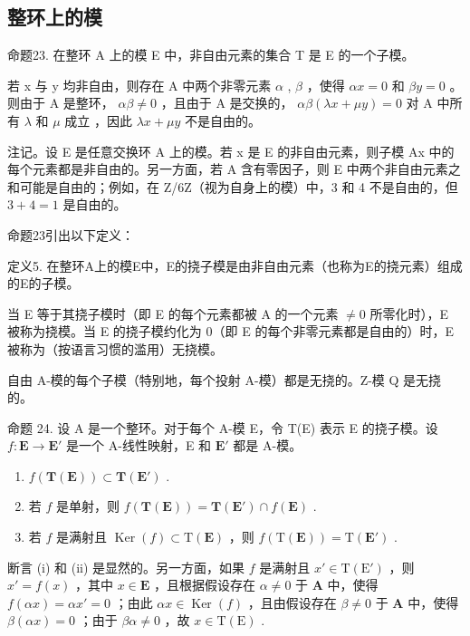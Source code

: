 \subsection{整环上的模}

命题23. 在整环 A 上的模 E 中，非自由元素的集合 T 是 E 的一个子模。

若 x 与 y 均非自由，则存在 A 中两个非零元素 \(\alpha\) , \(\beta\) ，使得 \(\alpha x = 0\) 和 \(\beta y = 0\) 。则由于 A 是整环， \(\alpha\beta \neq 0\) ，且由于 A 是交换的， \(\alpha\beta(\lambda x + \mu y) = 0\) 对 A 中所有 \(\lambda\) 和 \(\mu\) 成立 ，因此 \(\lambda x + \mu y\) 不是自由的。

注记。设 E 是任意交换环 A 上的模。若 x 是 E 的非自由元素，则子模 Ax 中的每个元素都是非自由的。另一方面，若 A 含有零因子，则 E 中两个非自由元素之和可能是自由的；例如，在 Z/6Z（视为自身上的模）中，3 和 4 不是自由的，但 \(3 + 4 = 1\) 是自由的。

命题23引出以下定义：

定义5. 在整环A上的模E中，E的挠子模是由非自由元素（也称为E的挠元素）组成的E的子模。

当 E 等于其挠子模时（即 E 的每个元素都被 A 的一个元素 \(\neq0\) 所零化时），E 被称为挠模。当 E 的挠子模约化为 0（即 E 的每个非零元素都是自由的）时，E 被称为（按语言习惯的滥用）无挠模。

自由 A-模的每个子模（特别地，每个投射 A-模）都是无挠的。Z-模 Q 是无挠的。

命题 24. 设 A 是一个整环。对于每个 A-模 E，令 T(E) 表示 E 的挠子模。设 \(f: \mathbf{E} \to \mathbf{E}'\) 是一个 A-线性映射，E 和 \(\mathbf{E}'\) 都是 A-模。

\begin{enumerate}
\def\labelenumi{(\roman{enumi})}
\item
  \(f(\mathbf{T}(\mathbf{E})) \subset \mathbf{T}(\mathbf{E}')\) .
\item
  若 \(f\) 是单射，则 \(f(\mathbf{T}(\mathbf{E})) = \mathbf{T}(\mathbf{E}') \cap f(\mathbf{E})\) .
\item
  若 \(f\) 是满射且 \(\operatorname{Ker}(f) \subset \mathrm{T}(\mathbf{E})\) ，则 \(f(\mathrm{T}(\mathbf{E})) = \mathrm{T}(\mathbf{E}')\) .
\end{enumerate}

断言 (i) 和 (ii) 是显然的。另一方面，如果 \(f\) 是满射且 \(x' \in \mathrm{T}(\mathrm{E}')\) ，则 \(x' = f(x)\) ，其中 \(x \in \mathbf{E}\) ，且根据假设存在 \(\alpha \neq 0\) 于 \(\mathbf{A}\) 中，使得 \(f(\alpha x) = \alpha x' = 0\) ；由此 \(\alpha x \in \operatorname{Ker}(f)\) ，且由假设存在 \(\beta \neq 0\) 于 \(\mathbf{A}\) 中，使得 \(\beta(\alpha x) = 0\) ；由于 \(\beta \alpha \neq 0\) ，故 \(x \in \mathrm{T}(\mathrm{E})\) .

